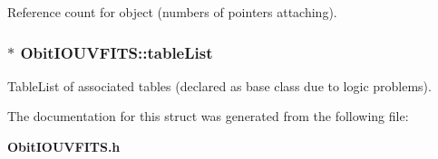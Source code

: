 Reference count for object (numbers of pointers attaching). 

\subsubsection{$\ast$ {\bf Obit\-IOUVFITS::table\-List}}\label{structObitIOUVFITS_o9}


Table\-List of associated tables (declared as base class due to logic problems). 



The documentation for this struct was generated from the following file:\begin{CompactItemize}
\item 
{\bf Obit\-IOUVFITS.h}\end{CompactItemize}

